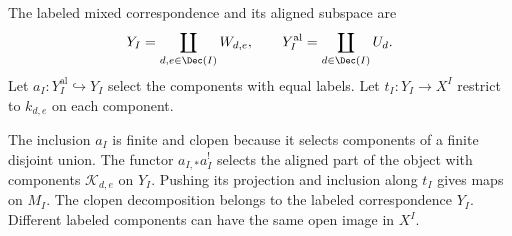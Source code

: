 \begin{definition}
\label{cbc:ran:correspondence}
The labeled mixed correspondence and its aligned subspace are
\[
 Y_I=\coprod_{d,e\in\Dec(I)}W_{d,e},\qquad
 Y_I^{\mathrm{al}}=\coprod_{d\in\Dec(I)}U_d.
\]
Let $a_I:Y_I^{\mathrm{al}}\hookrightarrow Y_I$ select the components
with equal labels. Let $t_I:Y_I\to X^I$ restrict to $k_{d,e}$ on
each component.
\end{definition}

The inclusion $a_I$ is finite and clopen because it selects components
of a finite disjoint union. The functor $a_{I,*}a_I^!$ selects the aligned
part of the object with components $\mathcal K_{d,e}$ on $Y_I$.
Pushing its projection and inclusion along $t_I$ gives maps on $M_I$.
The clopen decomposition belongs to the labeled correspondence $Y_I$.
Different labeled components can have the same open image in $X^I$.

